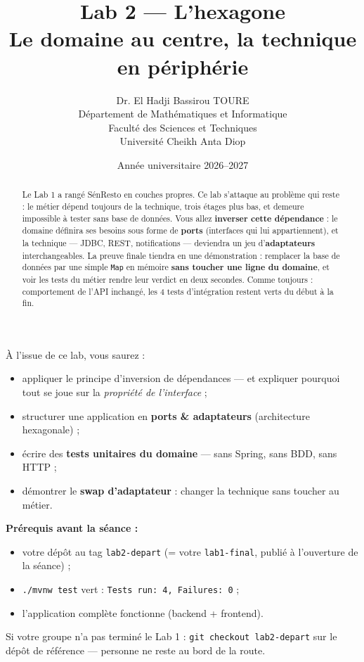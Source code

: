 \documentclass[a4paper,11pt]{article}
\title{\textcolor{titlecolor}{\Huge\textbf{Lab 2 --- L'hexagone}}\\[0.5em]
       \textcolor{sectitlecolor}{\LARGE Le domaine au centre, la technique en périphérie}}
\author{Dr. El Hadji Bassirou TOURE\\
        Département de Mathématiques et Informatique\\
        Faculté des Sciences et Techniques\\
        Université Cheikh Anta Diop}
\date{Année universitaire 2026--2027}
\begin{document}
\maketitle
\thispagestyle{empty}

\begin{abstract}
\noindent Le Lab 1 a rangé SénResto en couches propres. Ce lab s'attaque au
problème qui reste : le métier dépend toujours de la technique, trois étages
plus bas, et demeure impossible à tester sans base de données. Vous allez
\textbf{inverser cette dépendance} : le domaine définira ses besoins sous
forme de \textbf{ports} (interfaces qui lui appartiennent), et la technique
--- JDBC, REST, notifications --- deviendra un jeu d'\textbf{adaptateurs}
interchangeables. La preuve finale tiendra en une démonstration : remplacer
la base de données par une simple \texttt{Map} en mémoire \textbf{sans
toucher une ligne du domaine}, et voir les tests du métier rendre leur
verdict en deux secondes. Comme toujours : comportement de l'API inchangé,
les 4 tests d'intégration restent verts du début à la fin.
\end{abstract}

\begin{benefitbox}
À l'issue de ce lab, vous saurez :
\begin{itemize}[nosep]
  \item appliquer le principe d'inversion de dépendances --- et expliquer
        pourquoi tout se joue sur la \emph{propriété de l'interface} ;
  \item structurer une application en \textbf{ports \& adaptateurs}
        (architecture hexagonale) ;
  \item écrire des \textbf{tests unitaires du domaine} --- sans Spring,
        sans BDD, sans HTTP ;
  \item démontrer le \textbf{swap d'adaptateur} : changer la technique sans
        toucher au métier.
\end{itemize}
\end{benefitbox}

\begin{warningbox}
\textbf{Prérequis avant la séance :}
\begin{itemize}[nosep]
  \item votre dépôt au tag \texttt{lab2-depart} (= votre \texttt{lab1-final},
        publié à l'ouverture de la séance) ;
  \item \texttt{./mvnw test} vert : \texttt{Tests run: 4, Failures: 0} ;
  \item l'application complète fonctionne (backend + frontend).
\end{itemize}
Si votre groupe n'a pas terminé le Lab 1 : \texttt{git checkout lab2-depart}
sur le dépôt de référence --- personne ne reste au bord de la route.
\end{warningbox}
\end{document}
